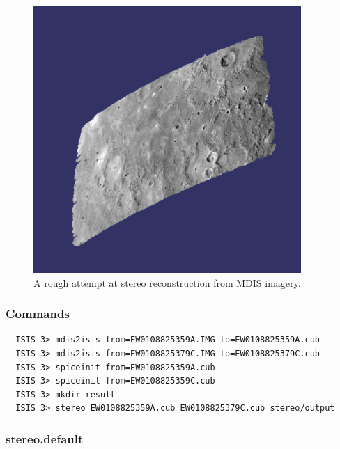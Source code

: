 \begin{figure}[h!]
\begin{minipage}{4in}
\includegraphics[width=4in]{images/examples/mdis/mdis_wide_example.png}
\end{minipage}
\hfill
\begin{minipage}{2in}
  \caption{ A rough attempt at stereo reconstruction from MDIS imagery. }
  \label{fig:mdis_attempt}
\end{minipage}
\end{figure}

\subsubsection*{Commands}

\begin{verbatim}
  ISIS 3> mdis2isis from=EW0108825359A.IMG to=EW0108825359A.cub
  ISIS 3> mdis2isis from=EW0108825379C.IMG to=EW0108825379C.cub
  ISIS 3> spiceinit from=EW0108825359A.cub
  ISIS 3> spiceinit from=EW0108825359C.cub
  ISIS 3> mkdir result
  ISIS 3> stereo EW0108825359A.cub EW0108825379C.cub stereo/output
\end{verbatim}

\subsubsection*{stereo.default}

